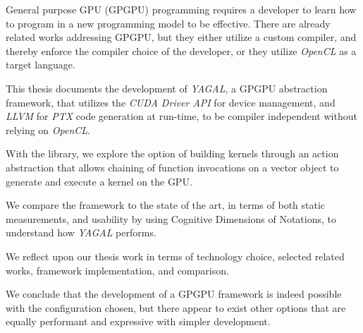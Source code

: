 General purpose GPU (GPGPU) programming requires a developer to learn how to program in a new programming model to be effective. There are already related works addressing GPGPU, but they either utilize a custom compiler, and thereby enforce the compiler choice of the developer, or they utilize \textit{OpenCL} as a target language.

This thesis documents the development of \textit{YAGAL}, a GPGPU abstraction framework, that utilizes the \textit{CUDA Driver API} for device management, and \textit{LLVM} for \textit{PTX} code generation at run-time, to be compiler independent without relying on \textit{OpenCL}.

With the library, we explore the option of building kernels through an action abstraction that allows chaining of function invocations on a vector object to generate and execute a kernel on the GPU.

We compare the framework to the state of the art, in terms of both static measurements, and usability by using Cognitive Dimensions of Notations, to understand how \textit{YAGAL} performs.

We reflect upon our thesis work in terms of technology choice, selected related works, framework implementation, and comparison.

We conclude that the development of a GPGPU framework is indeed possible with the configuration chosen, but there appear to exist other options that are equally performant and expressive with simpler development.